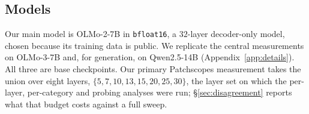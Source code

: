 \subsection{Models}

Our main model is OLMo-2-7B \citep{olmo-2025-olmo2} in \texttt{bfloat16}, a
$32$-layer decoder-only model, chosen because its training data is public. We
replicate the central measurements on OLMo-3-7B and, for generation, on
Qwen2.5-14B \citep{qwen-2024-qwen25} (Appendix~\ref{app:details}). All three are
base checkpoints. Our primary Patchscopes measurement takes the union over eight
layers, $\{5, 7, 10, 13, 15, 20, 25, 30\}$, the layer set on which the
per-layer, per-category and probing analyses were run; \S\ref{sec:disagreement}
reports what that budget costs against a full sweep.
